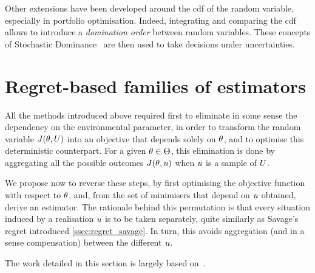 \documentclass[../../Main_ManuscritThese.tex]{subfiles}
\newcommand\imgpath{/home/victor/acadwriting/Manuscrit/Text/Chapter3/img/}
\begin{document}

Other extensions have been developed around the cdf of the random
variable, especially in portfolio optimisation. Indeed, integrating
and comparing the cdf allows to introduce a \emph{domination order}
between random variables. These concepts of Stochastic
Dominance~\citep{ogryczak_stochastic_1997} are then used to take
decisions under uncertainties.


\section{Regret-based families of estimators}
\label{sec:rr_family}
All the methods introduced above required first to eliminate in some
sense the dependency on the environmental parameter, in order to
transform the random variable $J(\theta, U)$ into an objective that
depends solely on $\theta$, and to optimise this deterministic
counterpart.  For a given $\theta\in\Theta$, this elimination is done by
aggregating all the possible outcomes $J(\theta, u)$ when $u$ is a
sample of $U$.


We propose now to reverse these steps, by first optimising the
objective function with respect to $\theta$, and, from the set of
minimisers that depend on $u$ obtained, derive an estimator. The
rationale behind this permutation is that every situation induced by a
realisation $u$ is to be taken separately, quite similarly as
Savage's regret introduced \cref{ssec:regret_savage}.  In turn, this
avoids aggregation (and in a sense compensation) between the different
$u$.

The work detailed in this section is largely based
on~\cite{trappler_robust_2020}.

%   
\end{document}
